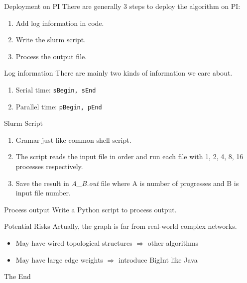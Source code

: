 \documentclass{beamer}
\begin{document}
\begin{frame}{Deployment on PI}
There are generally 3 steps to deploy the algorithm on PI:
\begin{enumerate}
	\item Add log information in code.
	\item Write the slurm script.
	\item Process the output file.
\end{enumerate}
\end{frame}

\begin{frame}[fragile]{Log information}
There are mainly two kinds of information we care about.
\begin{enumerate}
	\item Serial time: \verb|sBegin, sEnd|
	\item Parallel time: \verb|pBegin, pEnd|
\end{enumerate}
\end{frame}

\begin{frame}{Slurm Script}
\begin{enumerate}
	\item Gramar just like common shell script.
	\item The script reads the input file in order and run each file with 1, 2, 4, 8, 16 processes respectively.
	\item Save the result in \textit{A\_B.out} file where A is number of progresses and B is input file number.
\end{enumerate}
\end{frame}

\begin{frame}{Process output}
Write a Python script to process output.  
\end{frame}

\begin{frame}{Potential Risks}
Actually, the graph is far from real-world complex networks.
\begin{itemize}
\item May have wired topological structures $\Rightarrow$ other algorithms
\item May have large edge weights $\Rightarrow$ introduce BigInt like Java
\end{itemize}
\end{frame}




\begin{frame}
\Huge{\centerline{The End}}
\end{frame}

\end{document}

